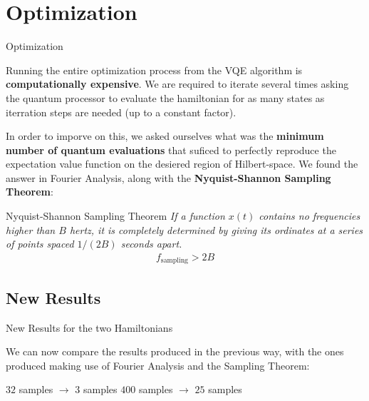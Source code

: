\documentclass[9pt, handout, aspectratio=169]{beamer}		%
\begin{document}
\section{Optimization}

\begin{frame}{Optimization}

	Running the entire optimization process from the VQE algorithm is \textbf{computationally expensive}. We are required to iterate several times asking the quantum processor to evaluate the hamiltonian for as many states as iterration steps are needed (up to a constant factor).

	\medskip

	In order to imporve on this, we asked ourselves what was the \textbf{minimum number of quantum evaluations} that suficed to perfectly reproduce the expectation value function on the desiered region of Hilbert-space. We found the answer in Fourier Analysis, along with the \textbf{Nyquist-Shannon Sampling Theorem}:

	\begin{block}{Nyquist-Shannon Sampling Theorem}
		\emph{If a function $x(t)$ contains no frequencies higher than $B$ hertz, it is completely determined by giving its ordinates at a series of points spaced $1/(2B)$ seconds apart.}
		\medskip
		\begin{align*}
			f_{\text{sampling}} > 2B
		\end{align*}
	\end{block}

\end{frame}


	\subsection{New Results}

	\begin{frame}{New Results for the two Hamiltonians}

		We can now compare the results produced in the previous way, with the ones produced making use of Fourier Analysis and the Sampling Theorem:

		\begin{multicols}{2}
			$32$ samples $\rightarrow$ $3$ samples
			\columnbreak
			$400$ samples $\rightarrow$ $25$ samples
		\end{multicols}

	\end{frame}
\end{document}
